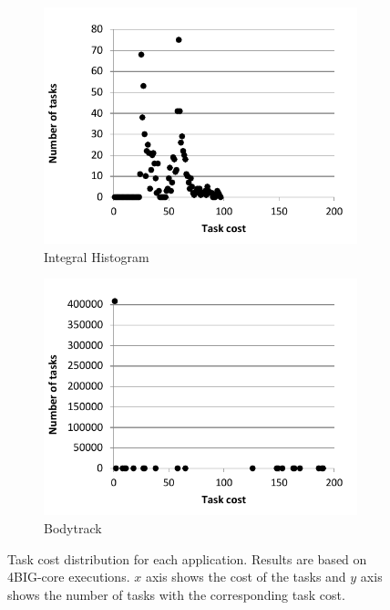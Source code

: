 \begin{figure}[!t]
\begin{subfigure}[b]{0.3\textwidth}
  \includegraphics[width=\textwidth]{Figs/histogram_8x8_distribution.pdf}
  \caption{Integral Histogram}
  \label{histogram_dist}
\end{subfigure}
\begin{subfigure}[b]{0.3\textwidth}
  \includegraphics[width=\textwidth]{Figs/bodytrack_native_distribution.pdf}
  \caption{Bodytrack}
  \label{bodytrack_dist}
\end{subfigure}
  \caption{Task cost distribution for each application. Results are based on 4BIG-core executions. $x$ axis shows the cost of the tasks and $y$ axis shows the number of tasks with the corresponding task cost.}
  \label{distributions}
  \vspace{-0.4cm}
\end{figure}


